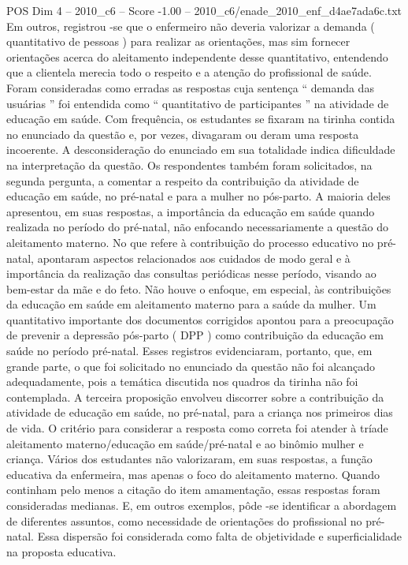 \begin{textsample}{POS Dim 4 – 2010\_c6 – Score -1.00 – 2010\_c6/enade\_2010\_enf\_d4ae7ada6c.txt}
Em outros, registrou -se que o enfermeiro não deveria valorizar a demanda ( quantitativo de pessoas ) para realizar as orientações, mas sim fornecer orientações acerca do aleitamento independente desse quantitativo, entendendo que a clientela merecia todo o respeito e a atenção do profissional de saúde.
Foram consideradas como erradas as respostas cuja sentença “ demanda das usuárias ” foi entendida como “ quantitativo de participantes ” na atividade de educação em saúde.
Com frequência, os estudantes se fixaram na tirinha contida no enunciado da questão e, por vezes, divagaram ou deram uma resposta incoerente.
A desconsideração do enunciado em sua totalidade indica dificuldade na interpretação da questão.
Os respondentes também foram solicitados, na segunda pergunta, a comentar a respeito da contribuição da atividade de educação em saúde, no pré-natal e para a mulher no pós-parto.
A maioria deles apresentou, em suas respostas, a importância da educação em saúde quando realizada no período do pré-natal, não enfocando necessariamente a questão do aleitamento materno.
No que refere à contribuição do processo educativo no pré-natal, apontaram aspectos relacionados aos cuidados de modo geral e à importância da realização das consultas periódicas nesse período, visando ao bem-estar da mãe e do feto.
Não houve o enfoque, em especial, às contribuições da educação em saúde em aleitamento materno para a saúde da mulher.
Um quantitativo importante dos documentos corrigidos apontou para a preocupação de prevenir a depressão pós-parto ( DPP ) como contribuição da educação em saúde no período pré-natal.
Esses registros evidenciaram, portanto, que, em grande parte, o que foi solicitado no enunciado da questão não foi alcançado adequadamente, pois a temática discutida nos quadros da tirinha não foi contemplada.
A terceira proposição envolveu discorrer sobre a contribuição da atividade de educação em saúde, no pré-natal, para a criança nos primeiros dias de vida.
O critério para considerar a resposta como correta foi atender à tríade aleitamento materno/educação em saúde/pré-natal e ao binômio mulher e criança.
Vários dos estudantes não valorizaram, em suas respostas, a função educativa da enfermeira, mas apenas o foco do aleitamento materno.
Quando continham pelo menos a citação do item amamentação, essas respostas foram consideradas medianas.
E, em outros exemplos, pôde -se identificar a abordagem de diferentes assuntos, como necessidade de orientações do profissional no pré-natal.
Essa dispersão foi considerada como falta de objetividade e superficialidade na proposta educativa.

\end{textsample}

